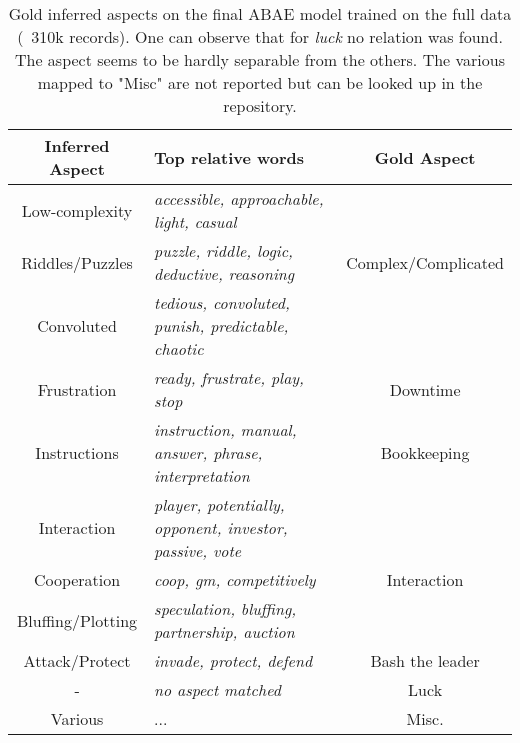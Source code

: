 \begin{center}
    \begin{table}
        \begin{tabular}{c l c}
            \hline
            Inferred Aspect   & Top relative words                                              & Gold Aspect \\ [0.5ex]
            \hline\hline
            Low-complexity    & \textit{accessible, approachable, light, casual}                &                     \\
            Riddles/Puzzles   & \textit{puzzle, riddle, logic, deductive, reasoning}            & Complex/Complicated \\
            Convoluted        & \textit{tedious, convoluted, punish, predictable, chaotic}      &                     \\
            \hline
            Frustration       & \textit{ready, frustrate, play, stop}                           & Downtime            \\
            \hline
            Instructions      & \textit{instruction, manual, answer, phrase, interpretation}    & Bookkeeping         \\
            \hline
            Interaction       & \textit{player, potentially, opponent, investor, passive, vote} &                     \\
            Cooperation       & \textit{coop, gm, competitively}                                & Interaction         \\
            Bluffing/Plotting & \textit{speculation, bluffing, partnership, auction}            &                     \\
            \hline
            Attack/Protect    & \textit{invade, protect, defend}                                & Bash the leader     \\
            \hline
            -                 & \textit{no aspect matched}                                      & Luck                \\
            \hline
            Various           & ...                                                             & Misc.               \\
            \hline
        \end{tabular}
        \caption{Gold inferred aspects on the final ABAE model trained on the full data (~310k records).
        One can observe that for \textit{luck} no relation was found.
        The aspect seems to be hardly separable from the others.
        The various mapped to "Misc" are not reported but can be looked up in the repository.
        }
        \label{best-310}

    \end{table}

\end{center}


